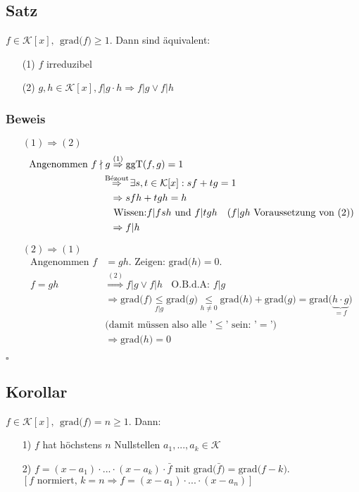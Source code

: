 \documentclass[12pt,titlepage, pdf]{article}
\newcommand{\grad}[1]{\textrm{grad(}#1\textrm{)}}
\newcommand{\K}{\mathcal{K}}
\newcommand{\qed}{\hfill$\square$}
\renewcommand{\>}{\rightarrow}
\renewcommand{\*}{\cdot}
\begin{document}
	\subsection{Satz}
	$f \in \K[x], ~~\grad{f} \geq 1$. Dann sind äquivalent: 
	\begin{itemize}
		\item[(1)] $f$ irreduzibel
		\item[(2)] $g,h \in \K[x], f \vert g\cdot h \Rightarrow f \vert g \lor f\vert h$
	\end{itemize}
	\subsubsection*{Beweis}
	\begin{itemize}
		\item[$(1)\Rightarrow (2)$] 
		\begin{align*}
		\text{Angenommen }f \nmid g &\overset{(1)}{\Rightarrow} \text{ggT}(f,g) = 1 \\&~~\mathclap{\overset{\textrm{Bézout}}{\Rightarrow}} ~~~~ \exists s,t \in \K[x]: sf  + tg = 1\\
		&\Rightarrow sfh + tgh = h\\
		&\text{ Wissen:} f \vert fsh \text{ und } f \vert tgh~~~ \text{($f\vert gh$ Voraussetzung von (2)}) \\
		&\Rightarrow f \vert h 
		\end{align*}
		\item[$(2)\Rightarrow (1)$] 
		\begin{align*}
		\text{Angenommen }f&=gh\text{. Zeigen: }\grad{h}=0.\\
		f = gh &\overset{(2)}{\Rightarrow} f \vert g \lor f \vert h ~~~~\text{O.B.d.A: } f \vert g \\
		&\Rightarrow \grad{f} \underset{f\vert g}{\leq}  \grad{g}
		\underset{h\neq0}{\leq} \grad{h} + \grad{g} = \grad{\underbrace{h \cdot g}_{= f}} \\
		&\text{(damit müssen also alle '$\leq$' sein: '$=$')}\\
		&\Rightarrow \grad{h} = 0
		\end{align*}
	\end{itemize}
	\qed
	\subsection{Korollar}
	$f \in \K[x],~~ \grad{f} = n \geq 1$. Dann: 
	\begin{itemize}
		\item[1)] $f$ hat höchstens $n$ Nullstellen $a_1,...,a_k \in \K$
		\item[2)] $f = (x-a_1) \cdot ... \cdot (x -a_k) \cdot \bar{f}$ mit  $\grad{\bar{f}} = \grad{f -k}$.\\
		$[f \text{ normiert, } k = n \Rightarrow f=(x-a_1) \cdot ... \cdot (x-a_n)]$
	\end{itemize}
\end{document}
